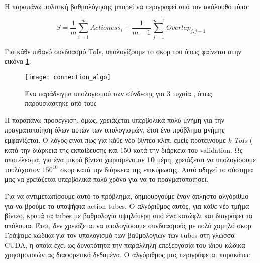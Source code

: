 Η παραπάνω πολιτική βαθμολόγησης μπορεί να περιγραφεί από τον ακόλουθο τύπο:

\[ S = \frac{1}{m} \sum_ {i=1}^{m} Actioness_i + \frac{1}{m-1} \sum_{j=1}^{m-1} Overlap_{j,j+1} \]

Για κάθε πιθανό συνδυασμό \en ToIs\gr, υπολογίζουμε το σκορ του όπως φαίνεται στην εικόνα \ref{fig:gr_connection_algo}.

\begin{figure}[h]
  \centering
  \en
  \texttt{[image: connection\_algo]}
  \caption{\gr Ένα παράδειγμα υπολογισμού των  σύνδεσης για 3 τυχαία , όπως παρουσιάστηκε από τους \en
  \cite{DBLP:journals/corr/HouCS17}}
  \label{fig:gr_connection_algo}
\end{figure}
\gr
Η παραπάνω προσέγγιση, όμως, χρειάζεται υπερβολικά πολύ μνήμη για την πραγματοποίηση όλων αυτών των υπολογισμών, έτσι
ένα πρόβλημα μνήμης εμφανίζεται. Ο λόγος είναι πως για κάθε νέο βίντεο κλιπ, εμείς προτείνουμε \en\textit{k ToIs} (
κατά την διάρκεια της εκπαίδευσης και 150 κατά την διάρκεια του \en validation\gr.
Ως αποτέλεσμα, για ένα μικρό βίντεο χωρισμένο σε \textbf{10 }μέρη, χρειάζεται να υπολογίσουμε τουλάχιστον
\textbf{$150^{10}$} σκορ κατά την διάρκεια της επικύρωσης. Αυτό οδηγεί το σύστημα μας να χρειάζεται υπερβολικά πολύ χρόνο
για να το πραγματοποιήσει.

Για να αντιμετωπίσουμε αυτό το πρόβλημα, δημιουργούμε έναν άπληστο αλγόριθμο για να βρούμε τα υποψήφια \en action tubes\gr.
Ο αλγόριθμος αυτός, για κάθε νέο τμήμα βίντεο, κρατά τα \en tubes \gr με βαθμολογία υψηλότερη από ένα κατώφλι και διαγράφει τα υπόλοιπα.
Έτσι, δεν χρειάζεται να υπολογίσουμε συνδυασμούς με πολύ χαμηλό σκορ. Γράψαμε κώδικα για τον υπολογισμό των βαθμολογιών των \en tubes \gr
στη γλώσσα \en CUDA\gr, η οποία έχει ως δυνατότητα την παράλληλη επεξεργασία του ίδιου κώδικα χρησιμοποιώντας διαφορετικά δεδομένα. Ο αλγόριθμος μας περιγράφεται παρακάτω:


